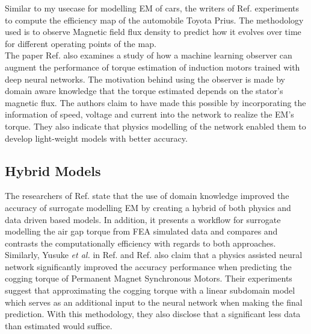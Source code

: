 \documentclass{report} %
\begin{document}
Similar to my usecase for modelling \ac{EM} of cars, the writers of Ref. \cite{ETA-V-2020} experiments to compute the efficiency map of the automobile Toyota Prius. 
The methodology used is to observe Magnetic field flux density to predict how it evolves over time for different operating points of the map.\\
The paper Ref. \cite{HMLO-2021} also examines a study of how a machine learning observer can augment the performance of torque estimation of 
induction motors trained with deep neural networks. The motivation behind using the observer is made by domain aware knowledge that the torque estimated depends on 
the stator's magnetic flux. The authors claim to have made this possible by incorporating the information of speed, voltage and current into the network to realize 
the \ac{EM}'s torque. They also indicate that physics modelling of the network enabled them to develop light-weight models with better accuracy.\\

\subsection{Hybrid Models}\label{subsec:LR Hybrid Models}
The researchers of Ref. \cite{SM EMT-2020} state that the use of domain knowledge improved the accuracy of surrogate modelling \ac{EM} by creating a hybrid of both 
physics and data driven based models. In addition, it presents a workflow for surrogate modelling the air gap torque from \ac{FEA} simulated data and compares 
and contrasts the computationally efficiency with regards to both approaches. \\

Similarly, Yusuke \textit{et al.} in Ref. \cite{PANN-MT-2021} and Ref. \cite{PANN-MOO-2021} also claim that a physics assisted neural network significantly improved the accuracy 
performance when predicting the cogging torque of Permanent Magnet Synchronous Motors. Their experiments suggest that approximating the cogging torque with a 
linear subdomain model which serves as an additional input to the neural network when making the final prediction. With this methodology, they also disclose that a 
significant less data than estimated would suffice.
\end{document}
